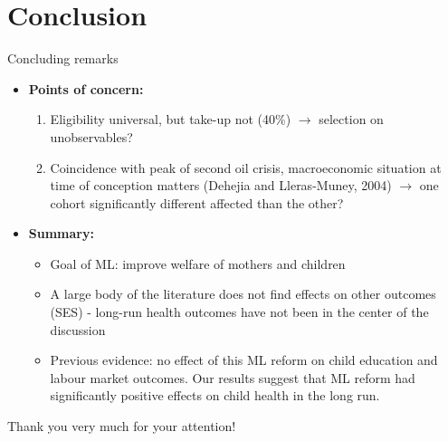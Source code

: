 \documentclass{beamer} %
\begin{document}
\section{Conclusion}
\begin{frame}{Concluding remarks}
\begin{itemize}
\item \textbf{Points of concern:}
\begin{enumerate}
\item Eligibility universal, but take-up not (40\%) $\rightarrow$ selection on unobservables?
\item Coincidence with peak of second oil crisis, macroeconomic situation at time of conception matters (Dehejia and Lleras-Muney, 2004) $\rightarrow$ one cohort significantly different affected than the other?
\end{enumerate}
\item \textbf{Summary:}
\begin{itemize}
\item Goal of ML: improve welfare of mothers and children
\item A large body of the literature does not find effects on other outcomes (SES) - long-run health outcomes have not been in the center of the discussion

\item Previous evidence: no effect of this ML reform on child education and labour market outcomes.
Our results suggest that ML reform had significantly positive effects on child health in the long run.


\end{itemize}
\end{itemize}



\end{frame}




\begin{frame}
\begin{center}
Thank you very much for your attention!
\end{center}




\end{frame}
\end{document}
